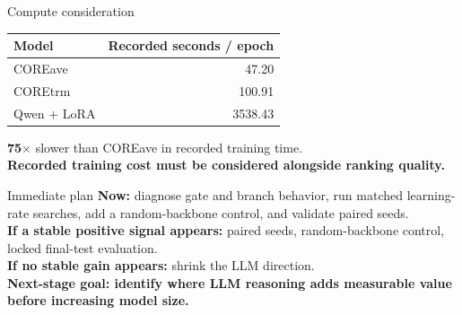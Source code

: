 \documentclass[aspectratio=169,10pt]{beamer}
\newcommand{\status}[1]{\textcolor{accentdark}{\textbf{#1}}}
\begin{document}
\begin{frame}{Compute consideration}
\begin{tabular}{lr}\toprule Model & Recorded seconds / epoch\\\midrule
COREave & 47.20\\
COREtrm & 100.91\\
Qwen + LoRA & 3538.43\\\bottomrule\end{tabular}
\vspace{1em}
{\Huge\textcolor{accentdark}{\textbf{75$\times$}}} slower than COREave in recorded training time.\\[1em]
\status{Recorded training cost must be considered alongside ranking quality.}
\end{frame}

\begin{frame}{Immediate plan}
\textbf{Now:} diagnose gate and branch behavior, run matched learning-rate searches, add a random-backbone control, and validate paired seeds.\\[1.2em]
\textbf{If a stable positive signal appears:} paired seeds, random-backbone control, locked final-test evaluation.\\[1.2em]
\textbf{If no stable gain appears:} shrink the LLM direction.\\[1.5em]
\status{Next-stage goal: identify where LLM reasoning adds measurable value before increasing model size.}
\end{frame}
\end{document}
